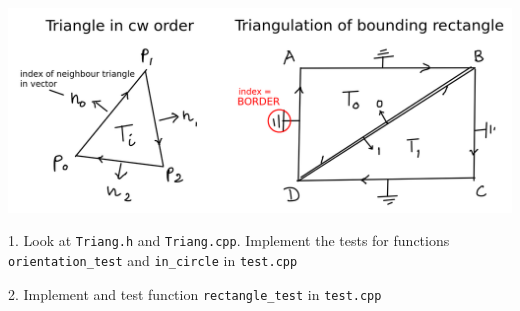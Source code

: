 \documentclass[a4paper,11pt]{article}
\begin{document}
\centerline{\includegraphics[width=0.9\linewidth]{triang.png}}


\linerule

1. Look at \texttt{Triang.h} and \texttt{Triang.cpp}. 
Implement the tests for functions \texttt{orientation\_test} and \texttt{in\_circle} in \texttt{test.cpp}

\linerule 

2. Implement and test function \texttt{rectangle\_test} in \texttt{test.cpp}
\end{document}
